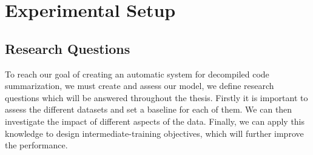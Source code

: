 \chapter{Experimental Setup}
\label{ExperimentalSetup}


\section{Research Questions}
To reach our goal of creating an automatic system for decompiled code summarization, we must create and assess our model, we define research questions which will be answered throughout the thesis. Firstly it is important to assess the different datasets and set a baseline for each of them. We can then investigate the impact of different aspects of the data. Finally, we can apply this knowledge to design intermediate-training objectives, which will further improve the performance.

